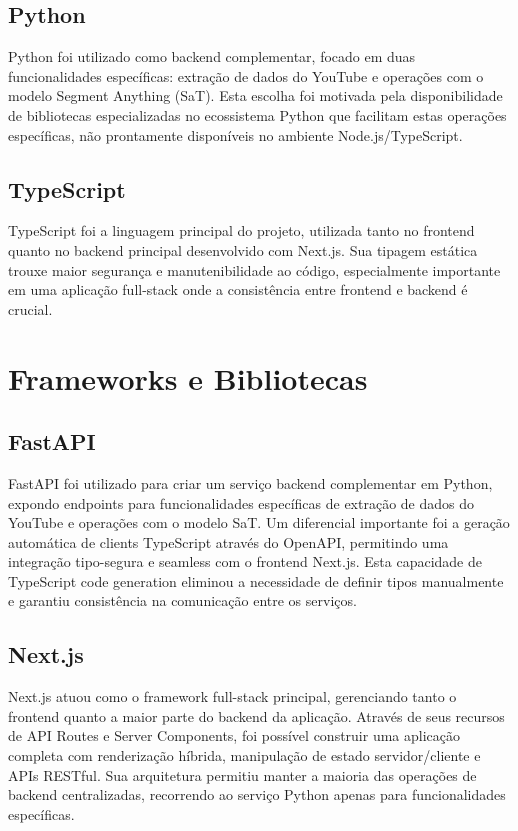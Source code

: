 \documentclass[tcc,capa]{texufpel}
\begin{document}
\subsection{Python}
Python foi utilizado como backend complementar, focado em duas funcionalidades específicas: extração de dados do YouTube e operações com o modelo Segment Anything (SaT). Esta escolha foi motivada pela disponibilidade de bibliotecas especializadas no ecossistema Python que facilitam estas operações específicas, não prontamente disponíveis no ambiente Node.js/TypeScript.

\subsection{TypeScript}
TypeScript foi a linguagem principal do projeto, utilizada tanto no frontend quanto no backend principal desenvolvido com Next.js. Sua tipagem estática trouxe maior segurança e manutenibilidade ao código, especialmente importante em uma aplicação full-stack onde a consistência entre frontend e backend é crucial.

\section{Frameworks e Bibliotecas}

\subsection{FastAPI}
FastAPI foi utilizado para criar um serviço backend complementar em Python, expondo endpoints para funcionalidades específicas de extração de dados do YouTube e operações com o modelo SaT. Um diferencial importante foi a geração automática de clients TypeScript através do OpenAPI, permitindo uma integração tipo-segura e seamless com o frontend Next.js. Esta capacidade de TypeScript code generation eliminou a necessidade de definir tipos manualmente e garantiu consistência na comunicação entre os serviços.

\subsection{Next.js}
Next.js atuou como o framework full-stack principal, gerenciando tanto o frontend quanto a maior parte do backend da aplicação. Através de seus recursos de API Routes e Server Components, foi possível construir uma aplicação completa com renderização híbrida, manipulação de estado servidor/cliente e APIs RESTful. Sua arquitetura permitiu manter a maioria das operações de backend centralizadas, recorrendo ao serviço Python apenas para funcionalidades específicas.
\end{document}
